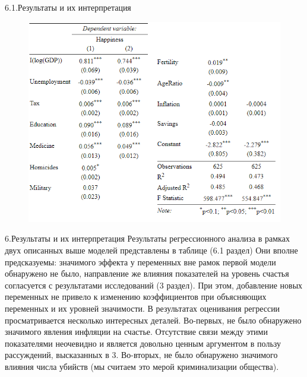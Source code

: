 \documentclass[aspectratio=169]{beamer}
\begin{document}
\begin{frame}{6.1.Результаты и их интерпретация}
   \begin{figure} \label{hompic}
            \centering
            \includegraphics[scale=0.75]{UnionTable.png}
    \end{figure}

\end{frame}

\begin{frame}{6.Результаты и их интерпретация}
\small
   Результаты регрессионного анализа в рамках двух описанных выше моделей представлены в таблице (6.1 раздел) Они вполне предсказуемы: значимого эффекта у переменных вне рамок первой модели обнаружено не было, направление же влияния показателей на уровень счастья согласуется с результатами
   исследований (3 раздел). При этом, добавление новых переменных не привело к изменению коэффициентов при объясняющих переменных и их уровней значимости.
\hfill \break
\hfill \break
В результатах оценивания регрессии просматривается несколько интересных деталей.
\hfill \break
\hfill \break
Во-первых, не было обнаружено значимого явления инфляции на счастье. Отсутствие связи между этими показателями неочевидно и является довольно ценным аргументом в пользу рассуждений, высказанных в 3.
\hfill \break
\hfill \break
Во-вторых, не было обнаружено значимого влияния числа убийств (мы считаем это мерой криминализации общества). 
\end{frame}
\end{document}
